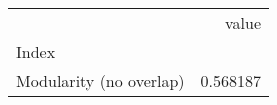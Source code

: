 \begin{tabular}{lr}
\toprule
{} &     value \\
Index                   &           \\
\midrule
Modularity (no overlap) &  0.568187 \\
\bottomrule
\end{tabular}
